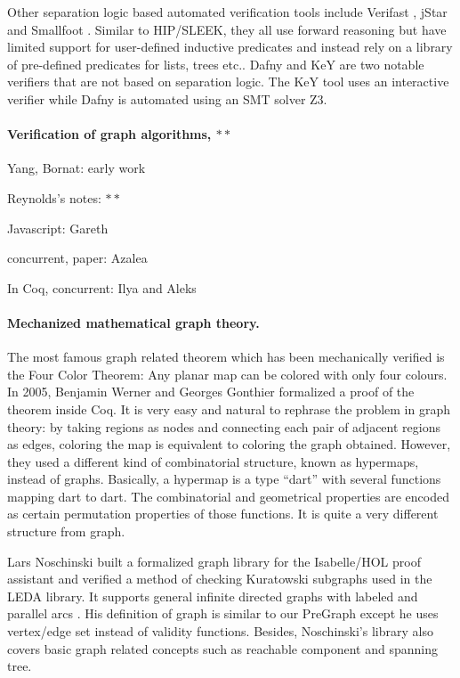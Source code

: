 Other separation logic based automated verification tools include Verifast \cite{jacobs:verifast}, jStar \cite{DistefanoP08} and Smallfoot \cite{berdine:smallfoot}. Similar to HIP/SLEEK, they all use forward reasoning but have limited support for user-defined inductive predicates and instead rely on a library of pre-defined predicates for lists, trees etc.. Dafny \cite{Leino10} and KeY \cite{Beckert:2007} are two notable verifiers that are not based on separation logic. The KeY tool uses an interactive verifier while Dafny is automated using an SMT solver Z3.  

\paragraph{Verification of graph algorithms, $**$}

Yang, Bornat: early work

Reynolds's notes: $**$

Javascript: Gareth

concurrent, paper: Azalea

In Coq, concurrent: Ilya and Aleks

\paragraph{Mechanized mathematical graph theory.}

The most famous graph related theorem which has been mechanically
verified is the Four Color Theorem: Any planar map can be colored with
only four colours. In 2005, Benjamin Werner and Georges Gonthier
formalized a proof of the theorem \cite{gonthier2005computer} inside
Coq. It is very easy and natural to rephrase the problem in graph
theory: by taking regions as nodes and connecting each pair of
adjacent regions as edges, coloring the map is equivalent to coloring
the graph obtained. However, they used a different kind of
combinatorial structure, known as hypermaps, instead of
graphs. Basically, a hypermap is a type ``dart'' with several
functions mapping dart to dart. The combinatorial and geometrical
properties are encoded as certain permutation properties of those
functions. It is quite a very different structure from graph.

Lars Noschinski built a formalized graph library for the Isabelle/HOL
proof assistant and verified a method of checking Kuratowski subgraphs
used in the LEDA library. It supports general infinite directed graphs
with labeled and parallel arcs \cite{Noschinski2015}. His definition
of graph is similar to our PreGraph except he uses vertex/edge set
instead of validity functions. Besides, Noschinski's library also
covers basic graph related concepts such as reachable component and
spanning tree.

